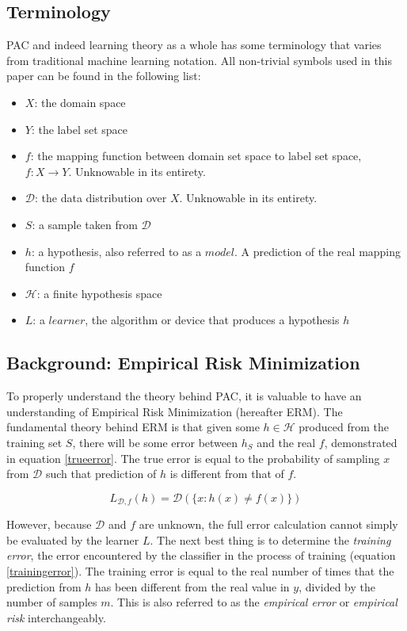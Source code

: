 \documentclass[10pt,conference]{IEEEtran}
\def\dist{\mathcal{D}}
\def\hypspace{\mathcal{H}}
\begin{document}
  \subsection{Terminology}
  PAC and indeed learning theory as a whole has some terminology that varies from traditional machine learning notation. All non-trivial symbols used in this paper can be found in the following list:
  \begin{itemize}
    \item $X$: the domain space
    \item $Y$: the label set space
    \item $f$: the mapping function between domain set space to label set space, $f: X \rightarrow Y$. Unknowable in its entirety.
    \item $\dist$: the data distribution over $X$. Unknowable in its entirety.
    \item $S$: a sample taken from $\dist$
    \item $h$: a hypothesis, also referred to as a $model$. A prediction of the real mapping function $f$
    \item $\hypspace$: a finite hypothesis space
    \item $L$: a $learner$, the algorithm or device that produces a hypothesis $h$
  \end{itemize} 
  \subsection{Background: Empirical Risk Minimization}
  To properly understand the theory behind PAC, it is valuable to have an understanding of Empirical Risk Minimization (hereafter ERM). The fundamental theory behind ERM is that given some $h \in \hypspace$ produced from the training set $S$, there will be some error between $h_S$ and the real $f$, demonstrated in equation \ref{trueerror}. The true error is equal to the probability of sampling $x$ from $\dist$ such that prediction of $h$ is different from that of $f$\cite{shais}.

  \begin{equation}
    \label{trueerror}
    L_{\dist, f}(h) = \dist(\{x : h(x) \neq f(x)\})
  \end{equation}

  However, because $\dist$ and $f$ are unknown, the full error calculation cannot simply be evaluated by the learner $L$\cite{shais}. The next best thing is to determine the \emph{training error}, the error encountered by the classifier in the process of training (equation \ref{trainingerror})\cite{shais}. The training error is equal to the real number of times that the prediction from $h$ has been different from the real value in $y$, divided by the number of samples $m$. This is also referred to as the \emph{empirical error} or \emph{empirical risk} interchangeably\cite{shais}.
\end{document}
